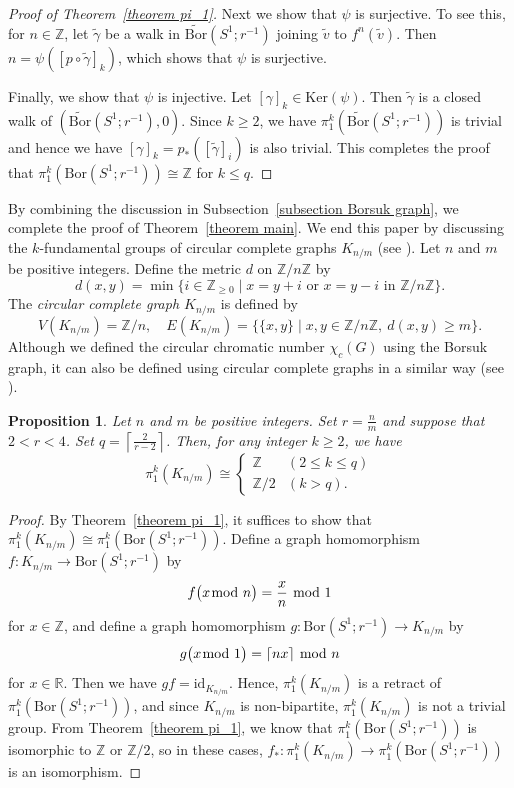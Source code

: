 \documentclass[11pt, amsfonts]{amsart}
\numberwithin{equation}{section}
\newtheorem{proposition}[thm]{Proposition}
\theoremstyle{definition}
\theoremstyle{remark}
\newcommand{\ZZ}{\mathbb{Z}}
\newcommand{\RR}{\mathbb{R}}
\newcommand{\Ker}{\mathrm{Ker}}
\newcommand{\tv}{\tilde{v}}
\newcommand{\Bor}{\mathrm{Bor}}
\newcommand{\tBor}{\widetilde{\mathrm{Bor}}}
\newcommand{\tgamma}{\tilde{\gamma}}
\begin{document}
\begin{proof}[Proof of Theorem~\ref{theorem pi_1}]
Next we show that $\psi$ is surjective. To see this, for $n \in \ZZ$, let $\tgamma$ be a walk in $\tBor(S^1 ; r^{-1})$ joining $\tv$ to $f^n(\tv)$. Then $n = \psi ([p \circ \tgamma]_k)$, which shows that $\psi$ is surjective.

Finally, we show that $\psi$ is injective. Let $[\gamma]_k \in \Ker(\psi)$. Then $\tgamma$ is a closed walk of $(\tBor(S^1; r^{-1}), 0)$. Since $k \ge 2$, we have $\pi_1^k(\tBor(S^1; r^{-1}))$ is trivial and hence we have $[\gamma]_k = p_*([\tgamma]_i)$ is also trivial. This completes the proof that $\pi_1^k(\Bor(S^1; r^{-1})) \cong \ZZ$ for $k \le q$.
\end{proof}

By combining the discussion in Subsection~\ref{subsection Borsuk graph}, we complete the proof of Theorem~\ref{theorem main}. We end this paper by discussing the \(k\)-fundamental groups of circular complete graphs $K_{n/m}$ (see \cite{PW, Zhu, Zhu2}). Let \(n\) and \(m\) be positive integers. Define the metric \(d\) on \(\ZZ / n\ZZ\) by
\[ d(x,y) = \min \{ i \in \ZZ_{\ge 0} \mid \text{$x = y + i$ or $x = y - i$ in $\ZZ / n \ZZ$} \}.\]
The \emph{circular complete graph \(K_{n/m}\)} is defined by
\[ V(K_{n/m}) = \ZZ/ n, \quad E(K_{n/m}) = \{ \{ x,y\} \mid x,y \in \ZZ / n \ZZ,\ d(x,y) \ge m \}.\]
Although we defined the circular chromatic number $\chi_c(G)$ using the Borsuk graph, it can also be defined using circular complete graphs in a similar way (see \cite{Zhu}).

\begin{proposition}
Let $n$ and $m$ be positive integers. Set $r = \frac{n}{m}$ and suppose that $2 < r < 4$. Set $q = \left\lceil \frac{2}{r - 2} \right\rceil $. Then, for any integer $k \ge 2$, we have
\[ \pi_1^k (K_{n/m}) \cong \begin{cases}
\ZZ & (2 \le k \le q) \\
\ZZ / 2 & (k > q).
\end{cases}\]
\end{proposition}
\begin{proof}
By Theorem~\ref{theorem pi_1}, it suffices to show that $\pi_1^k(K_{n/m}) \cong \pi_1^k(\Bor(S^1; r^{-1}))$. Define a graph homomorphism \( f \colon K_{n/m} \to \Bor(S^1; r^{-1}) \) by
\[
f \big(x \hspace{-2mm} \mod n \big) = \frac{x}{n} \hspace{-1mm}\mod 1
\]
for $x \in \ZZ$, and define a graph homomorphism \( g \colon \Bor(S^1 ; r^{-1}) \to K_{n/m} \) by
\[
g\big( x \hspace{-2mm}\mod 1 \big) = \lceil nx \rceil \hspace{-1mm}\mod n
\]
for $x \in \RR$. Then we have \( gf = \mathrm{id}_{K_{n/m}} \). Hence, \(\pi_1^k(K_{n/m})\) is a retract of \(\pi_1^k(\Bor(S^1 ; r^{-1}))\), and since \(K_{n/m}\) is non-bipartite, \(\pi_1^k(K_{n/m})\) is not a trivial group. From Theorem~\ref{theorem pi_1}, we know that \(\pi_1^k(\Bor(S^1 ; r^{-1}))\) is isomorphic to $\ZZ$ or $\ZZ / 2$, so in these cases, \(f_* \colon \pi_1^k(K_{n/m}) \to \pi_1^k(\Bor(S^1 ; r^{-1}))\) is an isomorphism.
\end{proof}
\end{document}

